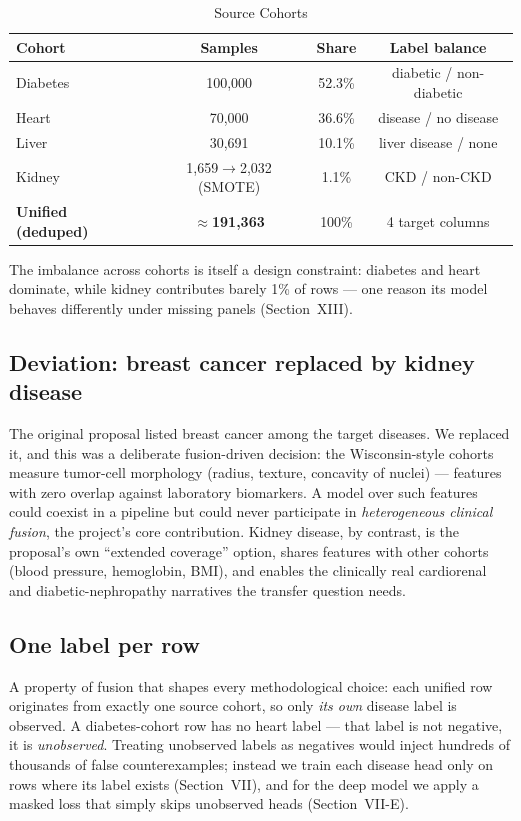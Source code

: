 \documentclass[journal]{IEEEtran}
\begin{document}
\begin{table}[t]
\centering
\caption{Source Cohorts}
\label{tab:datasets}
\small
\begin{tabular}{lccc}
\toprule
\textbf{Cohort} & \textbf{Samples} & \textbf{Share} & \textbf{Label balance} \\
\midrule
Diabetes  & 100{,}000 & 52.3\% & diabetic / non-diabetic \\
Heart     & 70{,}000  & 36.6\% & disease / no disease \\
Liver     & 30{,}691  & 10.1\% & liver disease / none \\
Kidney    & 1{,}659$\to$2{,}032 (SMOTE) & 1.1\% & CKD / non-CKD \\
\midrule
\textbf{Unified (deduped)} & \textbf{$\approx$191{,}363} & 100\% & 4 target columns \\
\bottomrule
\end{tabular}
\end{table}

The imbalance across cohorts is itself a design constraint: diabetes and heart dominate, while kidney contributes barely 1\% of rows --- one reason its model behaves differently under missing panels (Section~XIII).

\subsection{Deviation: breast cancer replaced by kidney disease}
The original proposal listed breast cancer among the target diseases. We replaced it, and this was a deliberate fusion-driven decision: the Wisconsin-style cohorts measure tumor-cell morphology (radius, texture, concavity of nuclei) --- features with zero overlap against laboratory biomarkers. A model over such features could coexist in a pipeline but could never participate in \emph{heterogeneous clinical fusion}, the project's core contribution. Kidney disease, by contrast, is the proposal's own ``extended coverage'' option, shares features with other cohorts (blood pressure, hemoglobin, BMI), and enables the clinically real cardiorenal and diabetic-nephropathy narratives the transfer question needs.

\subsection{One label per row}
A property of fusion that shapes every methodological choice: each unified row originates from exactly one source cohort, so only \emph{its own} disease label is observed. A diabetes-cohort row has no heart label --- that label is not negative, it is \emph{unobserved}. Treating unobserved labels as negatives would inject hundreds of thousands of false counterexamples; instead we train each disease head only on rows where its label exists (Section~VII), and for the deep model we apply a masked loss that simply skips unobserved heads (Section~VII-E).
\end{document}
